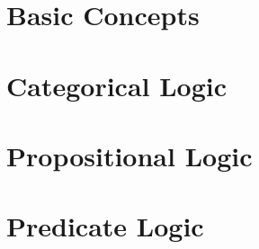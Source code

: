 \documentclass[nobib]{tufte-book}
\begin{document}

\raggedright
\setlength{\parindent}{1em}
\setlength{\parskip}{1em}

\frontmatter
\pagestyle{plain} %




{
\setlength{\parskip}{0em}

\renewcommand{\cftpartpresnum}{\sf\Large\partname\ }
\tableofcontents
}






\mainmatter
\setlength{\parindent}{1em}
\pagestyle{headings} %
\label{full_version} %

\listoffigures %

\newpage
\listoftables %

%
\part{Basic Concepts} \label{part:basic_concepts}




\part{Categorical Logic}\label{part:cat_logic}



\part{Propositional Logic} \label{part:prop_logic}



%

\part{Predicate Logic} \label{part:pred_logic}



\end{document}
